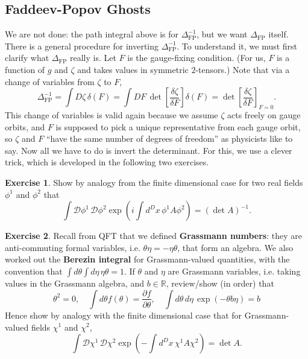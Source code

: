 \documentclass{report}
\theoremstyle{plain}
\theoremstyle{definition}
\newtheorem{exercise}{Exercise}[section]
\theoremstyle{remark}
\newcommand{\bR}{\mathbb{R}}
\newcommand{\cD}{\mathcal{D}}
\newcommand{\detFP}{\Delta_{\text{FP}}}
\newcommand{\pder}[2]{\frac{\partial #1}{\partial #2}}
\newcommand{\fder}[2]{\frac{\delta #1}{\delta #2}}
\begin{document}
\subsection{Faddeev-Popov Ghosts}
\label{chapterone-fpghosts}

We are not done: the path integral above is for $\detFP^{-1}$, but we
want $\detFP$ itself. There is a general procedure for inverting
$\detFP^{-1}$. To understand it, we must first clarify what $\detFP$
really is. Let $F$ is the gauge-fixing condition. (For us, $F$ is a
function of $g$ and $\zeta$ and takes values in symmetric
$2$-tensors.) Note that via a change of variables from $\zeta$ to $F$,
\[ \detFP^{-1} = \int D\zeta \, \delta(F) = \int DF \, \det\left[\fder{\zeta}{F}\right] \delta(F) = \det\left[\fder{\zeta}{F}\right]_{F=0}. \]
This change of variables is valid again because we assume $\zeta$ acts
freely on gauge orbits, and $F$ is supposed to pick a unique
representative from each gauge orbit, so $\zeta$ and $F$ ``have the
same number of degrees of freedom'' as physicists like to say. Now all
we have to do is invert the determinant. For this, we use a clever
trick, which is developed in the following two exercises.

\begin{exercise}
  Show by analogy from the finite dimensional case for two real fields
  $\phi^1$ and $\phi^2$ that
  \[ \int \cD \phi^1 \, \cD \phi^2 \exp\left(i\int d^Dx \, \phi^1 A \phi^2\right) = (\det A)^{-1}. \]
\end{exercise}

\begin{exercise}
  Recall from QFT that we defined {\bf Grassmann numbers}: they are
  anti-commuting formal variables, i.e. $\theta \eta = -\eta \theta$,
  that form an algebra. We also worked out the {\bf Berezin integral}
  for Grassmann-valued quantities, with the convention that $\int
  d\theta \int d\eta \, \eta\theta = 1$. If $\theta$ and $\eta$ are
  Grassmann variables, i.e. taking values in the Grassmann algebra,
  and $b \in \bR$, review/show (in order) that
  \[ \theta^2 = 0, \quad \int d\theta f(\theta) = \pder{f}{\theta}, \quad \int d\theta \, d\eta \, \exp(-\theta b\eta) = b \]
  Hence show by analogy with the finite dimensional case that for
  Grassmann-valued fields $\chi^1$ and $\chi^2$,
  \[ \int \cD \chi^1 \, \cD \chi^2 \exp\left(-\int d^Dx \, \chi^1 A \chi^2\right) = \det A. \]
\end{exercise}
\end{document}
